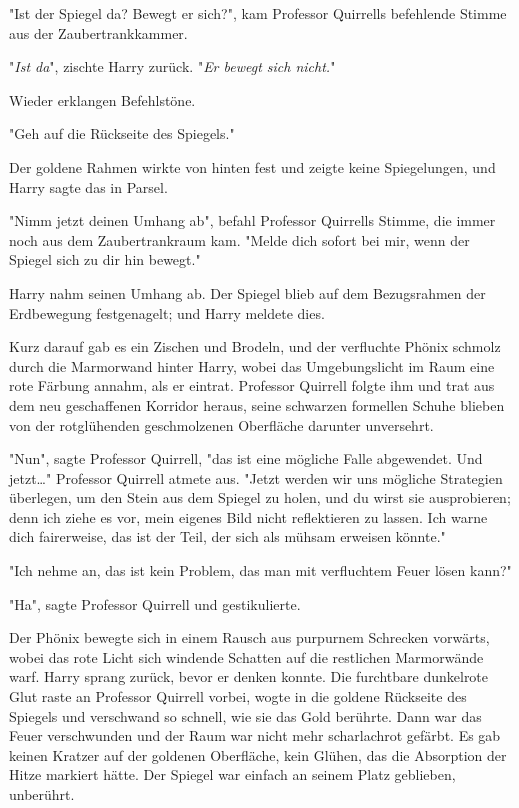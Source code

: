 {"Ist der Spiegel da? Bewegt er sich?", kam Professor Quirrells befehlende Stimme aus der Zaubertrankkammer.

"\emph{Ist da}", zischte Harry zurück. "\emph{Er bewegt sich nicht.}"

Wieder erklangen Befehlstöne.

"Geh auf die Rückseite des Spiegels."

Der goldene Rahmen wirkte von hinten fest und zeigte keine Spiegelungen, und Harry sagte das in Parsel.

"Nimm jetzt deinen Umhang ab", befahl Professor Quirrells Stimme, die immer noch aus dem Zaubertrankraum kam. "Melde dich sofort bei mir, wenn der Spiegel sich zu dir hin bewegt."

Harry nahm seinen Umhang ab. Der Spiegel blieb auf dem Bezugsrahmen der Erdbewegung festgenagelt; und Harry meldete dies.

Kurz darauf gab es ein Zischen und Brodeln, und der verfluchte Phönix schmolz durch die Marmorwand hinter Harry, wobei das Umgebungslicht im Raum eine rote Färbung annahm, als er eintrat. Professor Quirrell folgte ihm und trat aus dem neu geschaffenen Korridor heraus, seine schwarzen formellen Schuhe blieben von der rotglühenden geschmolzenen Oberfläche darunter unversehrt.

"Nun", sagte Professor Quirrell, "das ist eine mögliche Falle abgewendet. Und jetzt…" Professor Quirrell atmete aus. "Jetzt werden wir uns mögliche Strategien überlegen, um den Stein aus dem Spiegel zu holen, und du wirst sie ausprobieren; denn ich ziehe es vor, mein eigenes Bild nicht reflektieren zu lassen. Ich warne dich fairerweise, das ist der Teil, der sich als mühsam erweisen könnte."

"Ich nehme an, das ist kein Problem, das man mit verfluchtem Feuer lösen kann?"

"Ha", sagte Professor Quirrell und gestikulierte.

Der Phönix bewegte sich in einem Rausch aus purpurnem Schrecken vorwärts, wobei das rote Licht sich windende Schatten auf die restlichen Marmorwände warf. Harry sprang zurück, bevor er denken konnte. Die furchtbare dunkelrote Glut raste an Professor Quirrell vorbei, wogte in die goldene Rückseite des Spiegels und verschwand so schnell, wie sie das Gold berührte. Dann war das Feuer verschwunden und der Raum war nicht mehr scharlachrot gefärbt. Es gab keinen Kratzer auf der goldenen Oberfläche, kein Glühen, das die Absorption der Hitze markiert hätte. Der Spiegel war einfach an seinem Platz geblieben, unberührt.

}
